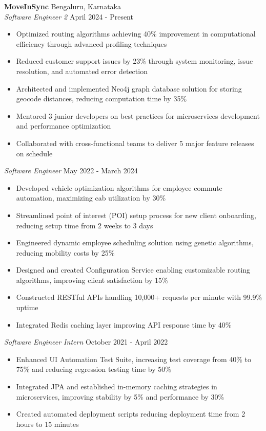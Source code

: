 \documentclass[a4paper]{article}
\begin{document}
\textbf{MoveInSync} \hfill Bengaluru, Karnataka\\
\textit{Software Engineer 2} \hfill April 2024 - Present\\
\vspace{-1mm}
\begin{itemize} \itemsep -2pt
    \item Optimized routing algorithms achieving 40\% improvement in computational efficiency through advanced profiling techniques
    \item Reduced customer support issues by 23\% through system monitoring, issue resolution, and automated error detection
    \item Architected and implemented Neo4j graph database solution for storing geocode distances, reducing computation time by 35\%
    \item Mentored 3 junior developers on best practices for microservices development and performance optimization
    \item Collaborated with cross-functional teams to deliver 5 major feature releases on schedule
\end{itemize}

\textit{Software Engineer} \hfill May 2022 - March 2024\\
\vspace{-1mm}
\begin{itemize} \itemsep -2pt
	\item Developed vehicle optimization algorithms for employee commute automation, maximizing cab utilization by 30\%
    \item Streamlined point of interest (POI) setup process for new client onboarding, reducing setup time from 2 weeks to 3 days
	\item Engineered dynamic employee scheduling solution using genetic algorithms, reducing mobility costs by 25\%
    \item Designed and created Configuration Service enabling customizable routing algorithms, improving client satisfaction by 15\%
    \item Constructed RESTful APIs handling 10,000+ requests per minute with 99.9\% uptime
    \item Integrated Redis caching layer improving API response time by 40\%
\end{itemize}

\textit{Software Engineer Intern} \hfill October 2021 - April 2022\\
\vspace{-1mm}
\begin{itemize} \itemsep -2pt
	\item Enhanced UI Automation Test Suite, increasing test coverage from 40\% to 75\% and reducing regression testing time by 50\%
	\item Integrated JPA and established in-memory caching strategies in microservices, improving stability by 5\% and performance by 30\%
    \item Created automated deployment scripts reducing deployment time from 2 hours to 15 minutes
\end{itemize}
\end{document}
